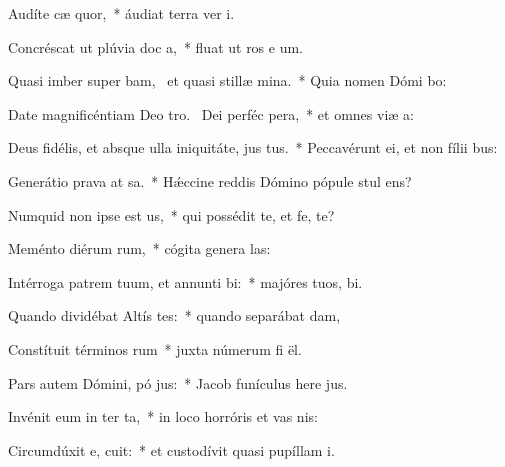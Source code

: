 \item Audíte cæ  quor,~* áudiat terra ver  i.
\item Concréscat ut plúvia doc a,~* fluat ut ros e um.
\item Quasi imber super bam,~\pscross{} et quasi stillæ  mina.~* Quia nomen Dómi bo:
\item Date magnificéntiam Deo tro.~\pscross{} Dei perféc  pera,~* et omnes viæ  a:
\item Deus fidélis, et absque ulla iniquitáte, jus  tus.~* Peccavérunt ei, et non fílii   bus:
\item Generátio prava at sa.~* Hǽccine reddis Dómino pópule stul  ens?
\item Numquid non ipse est  us,~* qui possédit te, et fe,   te?
\item Meménto diérum rum,~* cógita genera las:
\item Intérroga patrem tuum, et annunti bi:~* majóres tuos,   bi.
\item Quando dividébat Altís tes:~* quando separábat  dam,
\item Constítuit términos rum~* juxta númerum fi ël.
\item Pars autem Dómini, pó jus:~* Jacob funículus here jus.
\item Invénit eum in ter ta,~* in loco horróris et vas nis:
\item Circumdúxit e,  cuit:~* et custodívit quasi pupíllam  i.
